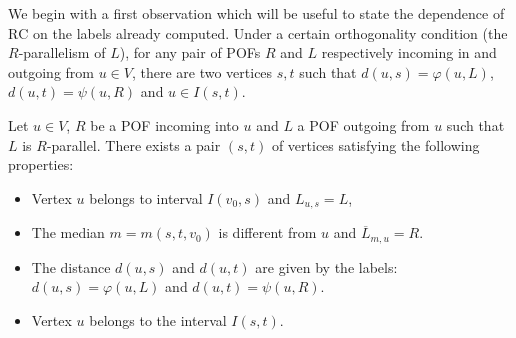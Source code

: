\documentclass[a4paper,UKenglish,numberwithinsect,cleveref, autoref]{lipics-v2021}
\newcommand{\rc}{\mbox{RC}}
\begin{document}
We begin with a first observation which will be useful to state the dependence of $\rc$ on the labels already computed. Under a certain orthogonality condition (the $R$-parallelism of $L$), for any pair of POFs $R$ and $L$ respectively incoming in and outgoing from $u \in V$, there are two vertices $s,t$ such that $d(u,s) = \varphi(u,L)$, $d(u,t) = \psi(u,R)$ and $u \in I(s,t)$.

\begin{theorem}
Let $u \in V$, $R$ be a POF incoming into $u$ and $L$ a POF outgoing from $u$ such that $L$ is $R$-parallel. There exists a pair $(s,t)$ of vertices satisfying the following properties:
\begin{itemize}
    \item Vertex $u$ belongs to interval $I(v_0,s)$ and $L_{u,s} = L$,
    \item The median $m = m(s,t,v_0)$ is different from $u$ and $\overline{L}_{m,u} = R$.
    \item The distance $d(u,s)$ and $d(u,t)$ are given by the labels: $d(u,s) = \varphi(u,L)$ and $d(u,t) = \psi(u,R)$.
    \item Vertex $u$ belongs to the interval $I(s,t)$.
\end{itemize}
\label{th:psi_plus_phi}
\end{theorem}
\end{document}
